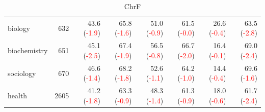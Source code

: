 \begin{table}[t]
\begin{subtable}{\textwidth}
{\begin{tabular}{lrrrrrrr}
            biology & 632 & 43.6 (\textcolor{red}{-1.9}) & 65.8 (\textcolor{red}{-1.6}) & 51.0 (\textcolor{red}{-0.9}) & 61.5 (\textcolor{red}{-0.0}) & 26.6 (\textcolor{red}{-0.4}) & 63.5 (\textcolor{red}{-2.8}) \\
            biochemistry & 651 & 45.1 (\textcolor{red}{-2.5}) & 67.4 (\textcolor{red}{-1.9}) & 56.5 (\textcolor{red}{-0.8}) & 66.7 (\textcolor{red}{-2.0}) & 16.4 (\textcolor{red}{-0.1}) & 69.0 (\textcolor{red}{-2.4}) \\
            sociology & 670 & 46.6 (\textcolor{red}{-1.4}) & 68.2 (\textcolor{red}{-1.8}) & 52.6 (\textcolor{red}{-1.1}) & 64.2 (\textcolor{red}{-1.0}) & 14.4 (\textcolor{red}{-0.4}) & 69.6 (\textcolor{red}{-1.6}) \\
            health & 2605 & 41.2 (\textcolor{red}{-1.8}) & 63.3 (\textcolor{red}{-0.9}) & 48.3 (\textcolor{red}{-1.4}) & 61.3 (\textcolor{red}{-0.9}) & 18.0 (\textcolor{red}{-0.6}) & 61.7 (\textcolor{red}{-2.4}) \\
        \bottomrule
        \end{tabular}
        }
        \caption{ChrF}
    \end{subtable}


\end{table}
